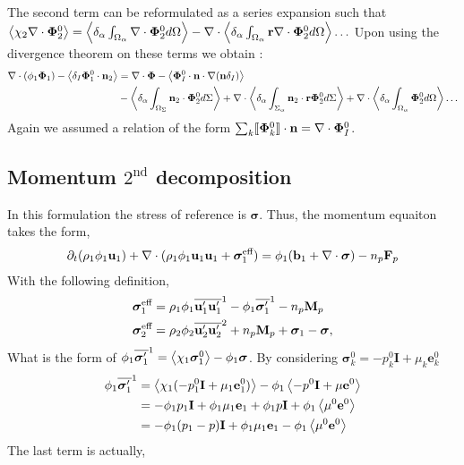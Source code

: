 The second term can be reformulated as a series expansion such that 
$\left< \chi_2 \mathbf{\nabla}\cdot \mathbf{\Phi}_2^0  \right> = \left<\delta_\alpha \int_{\Omega_\alpha} \mathbf{\nabla}\cdot \mathbf{\Phi}_2^0 d\Omega\right> - \mathbf{\nabla}\cdot\left<\delta_\alpha \int_{\Omega_\alpha} \textbf{r} \mathbf{\nabla}\cdot \mathbf{\Phi}_2^0 d\Omega\right> \ldots $
Upon using the divergence theorem on these terms we obtain :
\begin{align*}
    \mathbf{\nabla}\cdot  (\phi_1 \mathbf{\Phi}_1)
    - \left<\delta_I \mathbf{\Phi}_1^0 \cdot \textbf{n}_2\right>
    &=
    \mathbf{\nabla}\cdot  \mathbf{\Phi}
    - \left< \mathbf{\Phi}_I^0  \cdot \textbf{n}\cdot\mathbf{\nabla}(\textbf{n} \delta_I)\right>\\
    &- \left<\delta_\alpha \int_{\Omega_\Sigma} \textbf{n}_2 \cdot \mathbf{\Phi}_2^0 d\Sigma\right> 
    + \mathbf{\nabla}\cdot\left<\delta_\alpha \int_{\Sigma_\alpha}  \textbf{n}_2 \cdot \textbf{r}\mathbf{\Phi}_2^0 d\Sigma\right> 
    + \mathbf{\nabla}\cdot\left<\delta_\alpha \int_{\Omega_\alpha}  \mathbf{\Phi}_2^0 d\Omega\right> \ldots
    \\
\end{align*}
Again we assumed a relation of the form $\sum_k \llbracket \mathbf{\Phi}_k^0 \rrbracket \cdot \textbf{n} = \nabla\cdot \bm{\Phi}_I^0$. 

\subsection{Momentum $2^\text{nd}$ decomposition}
In this formulation the stress of reference is $\bm{\sigma}$.
Thus, the momentum equaiton takes the form,
\begin{align*}
    \partial_t (\rho_1\phi_1 \textbf{u}_1 )
    + \mathbf{\nabla}\cdot (\rho_1\phi_1 \textbf{u}_1  \textbf{u}_1
    + \bm{\sigma}^\text{eff}_1 )
    &= 
    \phi_1( \textbf{b}_1  +\mathbf{\nabla}\cdot  \bm{\sigma})
    - n_p\textbf{F}_p \\
\end{align*}
With the following definition, 
\begin{align*}
    \bm{\sigma}^\text{eff}_1
    &=\rho_1 \phi_1 \overline{\textbf{u}_1'\textbf{u}_1'}^1
    - \phi_1 \overline{\bm{\sigma}_1'}^1
    - n_p\textbf{M}_p 
    \\
    \bm{\sigma}^\text{eff}_2
    &= \rho_2\phi_2 \overline{ \textbf{u}_2'\textbf{u}_2'}^2 
    + n_p\textbf{M}_p 
    +\bm{\sigma}_1 - \bm{\sigma},
\end{align*}
What is the form of 
$\phi_1 \overline{\bm{\sigma}_1'}^1
 = \left<\chi_1 \bm{\sigma}_1^0\right>
 - \phi_1\bm{\sigma}
$. 
By considering $\bm{\sigma}_k^0 = -p_k^0 \textbf{I} + \mu_k \textbf{e}_k^0$
\begin{align*}
    \phi_1 \overline{\bm{\sigma}_1'}^1
 &= \left<\chi_1 (-p_1^0 \textbf{I} + \mu_1 \textbf{e}_1^0)\right>
 - \phi_1\left<-p^0 \textbf{I} + \mu \textbf{e}^0\right>\\
 &=  - \phi_1 p_1 \textbf{I} + \phi_1 \mu_1 \textbf{e}_1
 + \phi_1 p \textbf{I} + \phi_1 \left<\mu^0 \textbf{e}^0\right>\\
 &=  - \phi_1 (p_1 - p) \textbf{I} 
 + \phi_1 \mu_1 \textbf{e}_1 
 - \phi_1 \left<\mu^0 \textbf{e}^0\right>
\end{align*}
The last term is actually, 

